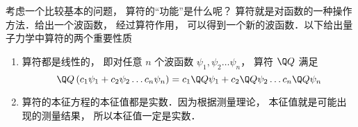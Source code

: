 考虑一个比较基本的问题， 算符的“功能”是什么呢？ 算符就是对函数的一种操作方法．给出一个波函数， 经过算符作用， 可以得到一个新的波函数．以下给出量子力学中算符的两个重要性质
\begin{enumerate}
\item 算符都是线性的， 即对任意 $n$ 个波函数 ${\psi _1},{\psi _2}\dots{\psi _n}$，  算符 $\Q Q$ 满足
\begin{equation}
\Q Q\left( {{c_1} {\psi _1} + {c_2} {\psi _2}\dots{c_n}{\psi _n}} \right) = {c_1}\Q Q  {\psi _1} + {c_2}\Q Q  {\psi _2}\dots{c_n}\Q Q  {\psi _n}
\end{equation}
\item 算符的本征方程的本征值都是实数．因为根据测量理论， 本征值就是可能出现的测量结果， 所以本征值一定是实数．
\end{enumerate}

